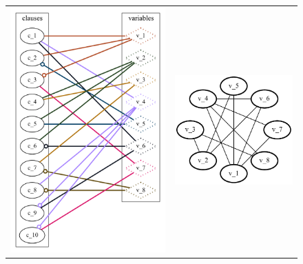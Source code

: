 \documentclass[a4paper, 12pt, bibliography=totoc]{scrartcl}
\begin{document}
\begin{figure}[h]
	\begin{tabularx}{\textwidth}{X X }
		\includegraphics[valign=c]{images/DA4SAT/results/IncidenceGraphStep1.pdf} & \includegraphics[valign=c]{images/DA4SAT/results/PrimalGraphStep1.pdf}

\end{tabularx}
\end{figure}
\end{document}
